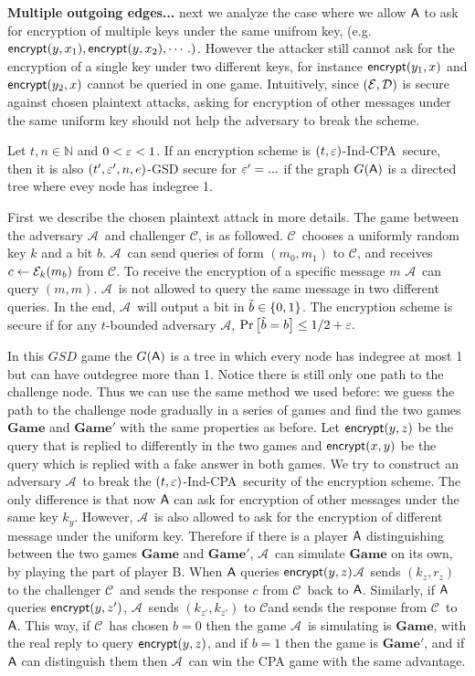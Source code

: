 \documentclass{article}
\newcommand{\tcpa}{$(t,\eps)$-Ind-CPA}
\def\B{{\sf B}}
\def\A{{\sf A}}
\def\E{{\cal E}}
\def\D{{\cal D}}
\def\a {${\mathcal A}$}
\def\ch {${\mathcal C}$}
\newcommand{\encrypt}{{\sf encrypt}}
\newcommand{\dgame}{{\mathbf{Game}}}
\begin{document}
\textbf{Multiple outgoing edges...} next we analyze the case where we allow $\A$ to ask for encryption of multiple keys under the same unifrom key, (e.g. $\encrypt(y,x_1), \encrypt(y,x_2), \cdots.)$. However the attacker still cannot ask for the encryption of a single key under two different keys, for instance $\encrypt(y_1,x)$ and$ \encrypt(y_2,x)$ cannot be queried in one game. Intuitively, since $(\E,\D)$ is secure against chosen plaintext attacks, asking for encryption of other messages under the same uniform key should not help the adversary to break the scheme. 

\begin{theorem}
Let $t,n \in \mathbb{N}$  and $0<\varepsilon<1$. If an encryption scheme is \tcpa~secure, then it is also $(t',\varepsilon',n,e)$-GSD secure for $\varepsilon'= ...$ if the graph $G(\A)$ is a directed tree where evey node has indegree 1. 
\end{theorem}

First we describe the chosen plaintext attack in more details. The game between the adversary \a~and challenger \ch, is as followed. \ch~chooses a uniformly random key $k$ and a bit $b$. \a~can send queries of form $(m_0,m_1)$ to \ch, and receives $c\leftarrow \E_k(m_b)$ from \ch. To receive the encryption of a specific message $m$ \a~can query $(m,m)$. \a~is not allowed to query the same message in two different queries. In the end, \a~will output a bit in $\tilde{b}\in \{0,1\}$. The encryption scheme is secure if for any $t$-bounded adversary \a, $\Pr \left[ \tilde{b}=b \right] \leq 1/2+\varepsilon.$

 In this $GSD$ game the $G(\A)$ is a tree in which every node has indegree at most 1 but can have outdegree more than 1. Notice there is still only one path to the challenge node. Thus we can use the same method we used before: we guess the path to the challenge node gradually in a series of games and find the two games $\dgame$ and $\dgame'$ with the same properties as before. Let $\encrypt(y,z)$ be the query that is replied to differently in the two games and $\encrypt(x,y)$ be the query which is replied with a fake answer in both games. We try to construct an adversary \a~to break the \tcpa~security of the encryption scheme. The only difference is that now $\A$ can ask for encryption of other messages under the same key $k_y$. However, \a~is also allowed to ask for the encryption of different message under the uniform key. Therefore if there is a player $\A$ distinguishing between the two games $\dgame$ and $\dgame'$, \a~can simulate $\dgame$ on its own, by playing the part of player \B. When $\A$ queries $\encrypt(y,z)$\a~sends $(k_z,r_z)$ to the challenger \ch~and sends the response $c$ from \ch~back to $\A$. Similarly, if $\A$ queries $\encrypt(y,z')$, \a~sends $(k_{z'},k_{z'})$ to \ch and sends the response from \ch~to $\A$. This way, if \ch~has chosen $b=0$ then the game \a~is simulating is $\dgame$, with the real reply to query $\encrypt(y,z)$, and if $b=1$ then the game is $\dgame'$, and if $\A$ can distinguish them then \a~can win the CPA game with the same advantage.
\end{document}
